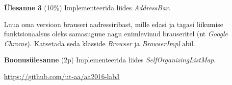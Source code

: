 \documentclass[a4paper]{article}
\begin{document}
\begin{problem}
\textbf{Ülesanne 3}  (10\%)
\newline
Implementeerida liides \textit{AddressBar}.


Luua oma versioon brauseri aadressiribast, mille edasi ja tagasi liikumise funktsionaalsus oleks samasugune nagu enimlevinud brauseritel (nt \textit{Google Chrome}). Katsetada seda klasside \textit{Browser} ja \textit{BrowserImpl} abil.
\end{problem}



\begin{problem}
\textbf{Boonusülesanne} (2p)
\newline
Implementeerida liides \textit{SelfOrganizingListMap}.
\end{problem}


\url{https://github.com/ut-aa/aa2016-lab3}
\end{document}
